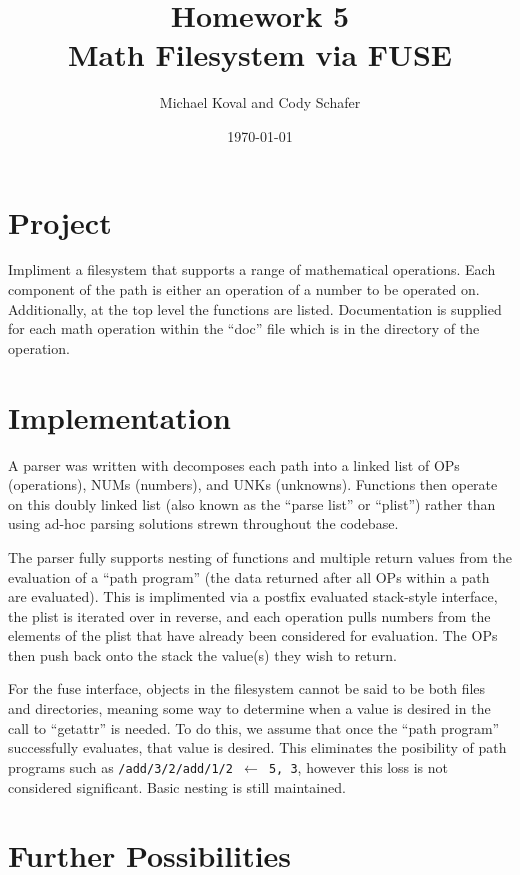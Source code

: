 \documentclass[10pt]{article}
\title{\textbf{Homework 5}\\
Math Filesystem via FUSE}
\author{Michael Koval and Cody Schafer}
\date{\today}
\begin{document}
\maketitle

\section{Project}

Impliment a filesystem that supports a range of mathematical operations.
Each component of the path is either an operation of a number to be
operated on. Additionally, at the top level the functions are listed.
Documentation is supplied for each math operation within the ``doc'' file
which is in the directory of the operation.

\section{Implementation}

A parser was written with decomposes each path into a linked list of OPs
(operations), NUMs (numbers), and UNKs (unknowns). Functions then operate
on this doubly linked list (also known as the ``parse list'' or ``plist'')
rather than using ad-hoc parsing solutions strewn throughout the codebase.

The parser fully supports nesting of functions and multiple return values
from the evaluation of a ``path program'' (the data returned after all
OPs within a path are evaluated). This is implimented via a postfix
evaluated stack-style interface, the plist is iterated over in reverse,
and each operation pulls numbers from the elements of the plist that have
already been considered for evaluation. The OPs then push back onto the
stack the value(s) they wish to return.

For the fuse interface, objects in the filesystem cannot be said to be
both files and directories, meaning some way to determine when a value is
desired in the call to ``getattr'' is needed. To do this, we assume that
once the ``path program'' successfully evaluates, that value is desired.
This eliminates the posibility of path programs such as
\texttt{/add/3/2/add/1/2 $\leftarrow$ 5, 3}, however this loss is not
considered significant. Basic nesting is still maintained.




\section{Further Possibilities}
\end{document}
